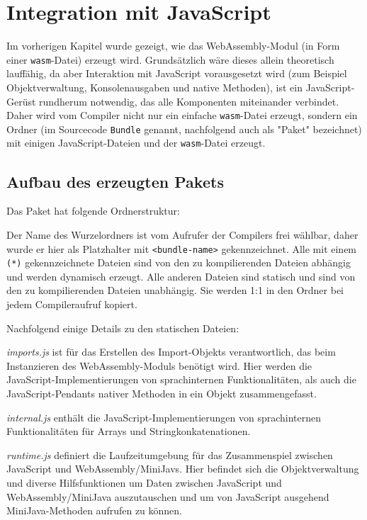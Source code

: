 \chapter{Integration mit JavaScript}

Im vorherigen Kapitel wurde gezeigt, wie das WebAssembly-Modul (in Form einer \lstinline{wasm}-Datei) erzeugt wird. Grundsätzlich wäre dieses allein theoretisch lauffähig, da aber Interaktion mit JavaScript vorausgesetzt wird (zum Beispiel Objektverwaltung, Konsolenausgaben und native Methoden), ist ein JavaScript-Gerüst rundherum notwendig, das alle Komponenten miteinander verbindet. Daher wird vom Compiler nicht nur ein einfache \lstinline{wasm}-Datei erzeugt, sondern ein Ordner (im Sourcecode \lstinline{Bundle} genannt, nachfolgend auch als "Paket" bezeichnet) mit einigen JavaScript-Dateien und der \lstinline{wasm}-Datei erzeugt.

\section{Aufbau des erzeugten Pakets}

Das Paket hat folgende Ordnerstruktur:


Der Name des Wurzelordners ist vom Aufrufer der Compilers frei wählbar, daher wurde er hier als Platzhalter mit \lstinline{<bundle-name>} gekennzeichnet. Alle mit einem \lstinline{(*)} gekennzeichnete Dateien sind von den zu kompilierenden Dateien abhängig und werden dynamisch erzeugt. Alle anderen Dateien sind statisch und sind von den zu kompilierenden Dateien unabhängig. Sie werden 1:1 in den Ordner bei jedem Compileraufruf kopiert.

Nachfolgend einige Details zu den statischen Dateien:

\emph{imports.js} ist für das Erstellen des Import-Objekts verantwortlich, das beim Instanzieren des WebAssembly-Moduls benötigt wird. Hier werden die JavaScript-Implementie\-rungen von sprachinternen Funktionalitäten, als auch die JavaScript-Pendants nativer Methoden in ein Objekt zusammengefasst.

\emph{internal.js} enthält die JavaScript-Implementierungen von sprachinternen Funktionalitäten für Arrays und Stringkonkatenationen.

\emph{runtime.js} definiert die Laufzeitumgebung für das Zusammenspiel zwischen JavaScript und WebAssembly/MiniJavs. Hier befindet sich die Objektverwaltung und diverse Hilfsfunktionen um Daten zwischen JavaScript und WebAssembly/MiniJava auszutauschen und um von JavaScript ausgehend MiniJava-Methoden aufrufen zu können.

